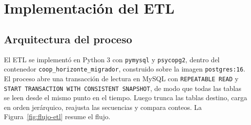 \begin{table}[H]
  \centering
  \caption{Vistas del esquema destino}
  \label{tab:vistas-destino}
\end{table}

\section{Implementación del ETL}

\subsection{Arquitectura del proceso}

El ETL se implementó en Python 3 con \texttt{pymysql} y \texttt{psycopg2},
dentro del contenedor \texttt{coop\_horizonte\_migrador}, construido sobre la
imagen \texttt{postgres:16}. El proceso abre una transacción de lectura en
MySQL con \texttt{REPEATABLE READ} y \texttt{START TRANSACTION WITH CONSISTENT
SNAPSHOT}, de modo que todas las tablas se leen desde el mismo punto en el
tiempo. Luego trunca las tablas destino, carga en orden jerárquico, reajusta
las secuencias y compara conteos. La Figura~\ref{fig:flujo-etl} resume el
flujo.

